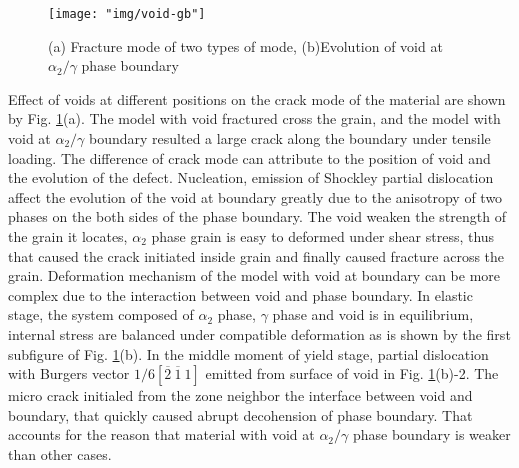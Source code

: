 \documentclass[materials,article,submit,moreauthors,pdftex,10pt,a4paper]{Definitions/mdpi}
\begin{document}
\begin{figure}[ht]
	\centering
	\texttt{[image: "img/void-gb"]}
	\caption{(a) Fracture mode of two types of mode,  (b)Evolution of void at $\alpha_2 / \gamma$ phase boundary}
	\label{fig:void-gb}
\end{figure}
Effect of voids at different positions on the crack mode of the material are shown by Fig. \ref{fig:void-gb}(a). The model with void fractured cross the grain, and the model with void at $\alpha_2 / \gamma$ boundary resulted a large crack along the boundary under tensile loading. The difference of crack mode can attribute to the position of void and the evolution of the defect. Nucleation, emission of Shockley partial dislocation affect the evolution of the void at boundary greatly due to the anisotropy of two phases on the both sides of the phase boundary. The void weaken the strength of the grain it locates,  $\alpha_2$ phase grain is easy to deformed under shear stress, thus that caused the crack initiated inside grain and finally caused fracture across the grain. Deformation mechanism of the model with void at boundary can be  more complex due to the interaction between void and phase boundary. In elastic stage, the system composed of $\alpha_2$ phase, $\gamma$ phase and void is in equilibrium, internal stress are balanced under compatible deformation as is shown by the first subfigure of Fig. \ref{fig:void-gb}(b). In the middle moment of yield stage, partial dislocation with Burgers vector $1/6[\overline{2}\ \overline{1}\ 1]$ emitted from surface of void in Fig. \ref{fig:void-gb}(b)-2. The micro crack initialed from the zone neighbor  the interface between void and boundary, that quickly caused abrupt decohension of phase boundary. That accounts for the reason that material with void at $\alpha_2 / \gamma$ phase boundary is weaker than other cases. 
\end{document}
